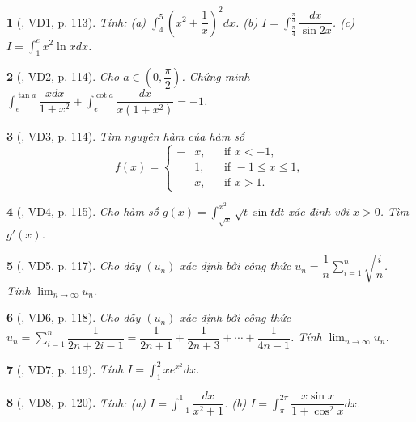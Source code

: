 \documentclass{article}
\newtheorem{baitoan}{}
\begin{document}
\begin{baitoan}[\cite{TLCT_giai_tich_12}, VD1, p. 113]
	Tính: (a) $\int_4^5 \left(x^2 + \dfrac{1}{x}\right)^2dx$. (b) $I = \int_{\frac{\pi}{4}}^{\frac{\pi}{3}} \dfrac{dx}{\sin2x}$. (c) $I = \int_1^e x^2\ln xdx$.
\end{baitoan}

\begin{baitoan}[\cite{TLCT_giai_tich_12}, VD2, p. 114]
	Cho $a\in\left(0,\dfrac{\pi}{2}\right)$. Chứng minh $\int_e^{\tan a} \dfrac{xdx}{1 + x^2} + \int_e^{\cot a} \dfrac{dx}{x(1 + x^2)} = -1$.
\end{baitoan}

\begin{baitoan}[\cite{TLCT_giai_tich_12}, VD3, p. 114]
	Tìm nguyên hàm của hàm số
	\begin{equation*}
		f(x) = \left\{\begin{split}
			-&x,&&\mbox{if } x < -1,\\
			&1,&&\mbox{if } -1\le x\le1,\\
			&x,&&\mbox{if } x > 1.
		\end{split}\right.
	\end{equation*}
\end{baitoan}

\begin{baitoan}[\cite{TLCT_giai_tich_12}, VD4, p. 115]
	Cho hàm số $g(x) = \int_{\sqrt{x}}^{x^2} \sqrt{t}\sin tdt$ xác định với $x > 0$. Tìm $g'(x)$.
\end{baitoan}

\begin{baitoan}[\cite{TLCT_giai_tich_12}, VD5, p. 117]
	Cho dãy $(u_n)$ xác định bởi công thức $u_n = \dfrac{1}{n}\sum_{i=1}^n \sqrt{\dfrac{i}{n}}$. Tính $\lim_{n\to\infty} u_n$.
\end{baitoan}

\begin{baitoan}[\cite{TLCT_giai_tich_12}, VD6, p. 118]
	Cho dãy $(u_n)$ xác định bởi công thức $u_n = \sum_{i=1}^n \dfrac{1}{2n + 2i - 1} = \dfrac{1}{2n + 1} + \dfrac{1}{2n + 3} + \cdots + \dfrac{1}{4n - 1}$. Tính $\lim_{n\to\infty} u_n$.
\end{baitoan}

\begin{baitoan}[\cite{TLCT_giai_tich_12}, VD7, p. 119]
	Tính $I = \int_1^2 xe^{x^2}dx$.
\end{baitoan}

\begin{baitoan}[\cite{TLCT_giai_tich_12}, VD8, p. 120]
	Tính: (a) $I = \int_{-1}^1 \dfrac{dx}{x^2 + 1}$. (b) $I = \int_{\pi}^{2\pi} \dfrac{x\sin x}{1 + \cos^2x}dx$.
\end{baitoan}
\end{document}
